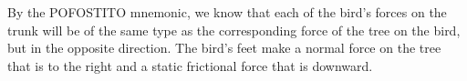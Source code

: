 By the POFOSTITO mnemonic, we know that each of the bird's forces on the trunk will be of the same
type as the corresponding force of the tree on the bird, but in the opposite direction. The bird's feet make a normal force on the tree that is to the right
and a static frictional force that is downward.



